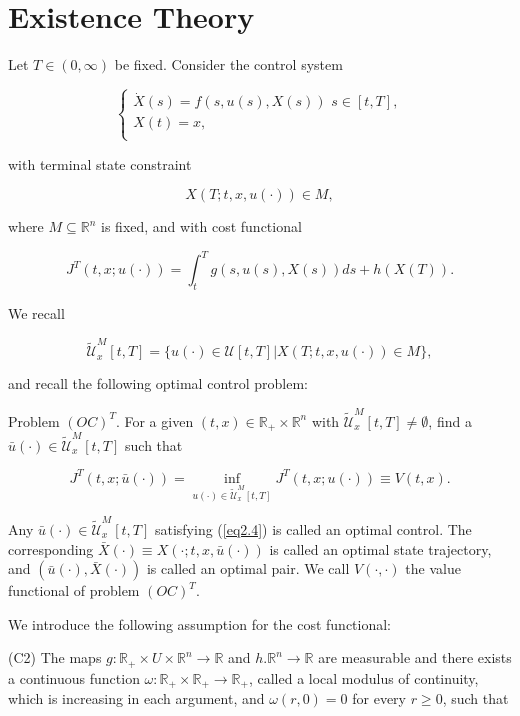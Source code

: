 \section{Existence Theory}
Let $T\in (0,\infty)$ be fixed. Consider the control system 

$$\left\{ \begin{array}{l}
	\dot{X}(s)=f(s,u(s),X(s))\,\,s\in [t,T], \\
	X(t)=x,\\
\end{array}
\right.$$

with terminal state constraint

$$X(T;t,x,u(\cdot))\in M,$$

where $M\subseteq \mathbb{R}^n$ is fixed, and with cost functional

\begin{equation*}
J^T(t,x;u(\cdot))=\int_{t}^{T}g(s,u(s),X(s))ds + h(X(T)).
\end{equation*}

We recall 

$$\tilde{\mathcal{U}}^M_x[t,T]=\{u(\cdot)\in\mathcal{U}[t,T] | X(T;t,x,u(\cdot))\in M\},$$

and recall the following optimal control problem:

Problem $(OC)^T$. For a given $(t,x)\in \mathbb{R}_{+}\times \mathbb{R}^n$ with $\tilde{\mathcal{U}}^M_x[t,T]\neq\emptyset$, find a $\bar{u}(\cdot)\in \tilde{\mathcal{U}}^M_x[t,T]$ such that

\begin{equation}\label{eq2.4} 
J^T(t,x;\bar{u}(\cdot))=\inf_{u(\cdot)\in \tilde{\mathcal{U}}^M_x[t,T]} J^T(t,x;u(\cdot))\equiv V(t,x).
\end{equation}

Any $\bar{u}(\cdot)\in \tilde{\mathcal{U}}^M_x[t,T]$ satisfying (\ref{eq2.4}) is called an optimal control. The corresponding $\bar{X}(\cdot)\equiv X(\cdot;t,x,\bar{u}(\cdot))$ is called an optimal state trajectory, and $(\bar{u}(\cdot),\bar{X}(\cdot))$ is called an optimal pair. We call $V(\cdot,\cdot)$ the value functional of problem $(OC)^T$.

We introduce the following assumption for the cost functional:

(C2) The maps $g:\mathbb{R}_{+}\times U\times \mathbb{R}^n\rightarrow \mathbb{R}$ and $h.\mathbb{R}^n\rightarrow \mathbb{R}$ are measurable and there exists a continuous function $\omega:\mathbb{R}_{+}\times\mathbb{R}_{+}\rightarrow \mathbb{R}_{+}$, called a local modulus of continuity, which is increasing in each argument, and $\omega(r,0)=0$ for every $r\geq 0$, such that 

